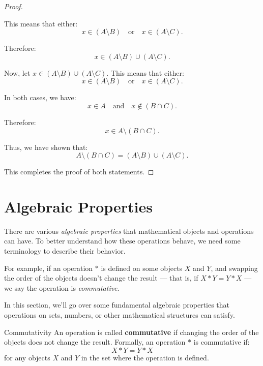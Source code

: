 \begin{proof}
\begin{enumerate}
        This means that either:
        \[
        x \in (A \setminus B) \quad \text{or} \quad x \in (A \setminus C).
        \]
        
        Therefore:
        \[
        x \in (A \setminus B) \cup (A \setminus C).
        \]
        
        Now, let \( x \in (A \setminus B) \cup (A \setminus C) \). This means that either:
        \[
        x \in (A \setminus B) \quad \text{or} \quad x \in (A \setminus C).
        \]
        
        In both cases, we have:
        \[
        x \in A \quad \text{and} \quad x \notin (B \cap C).
        \]
        
        Therefore:
        \[
        x \in A \setminus (B \cap C).
        \]
        
        Thus, we have shown that:
        \[
        A \setminus (B \cap C) = (A \setminus B) \cup (A \setminus C).
        \]
    \end{enumerate}
    
    This completes the proof of both statements.
\end{proof}    

\section{Algebraic Properties}

There are various \textit{algebraic properties} that mathematical objects and operations can have. To better understand how these operations behave, we need some terminology to describe their behavior. 

For example, if an operation \( * \) is defined on some objects \( X \) and \( Y \), and swapping the order of the objects doesn’t change the result — that is, if \( X * Y = Y * X \) — we say the operation is \textit{commutative}.

In this section, we’ll go over some fundamental algebraic properties that operations on sets, numbers, or other mathematical structures can satisfy.

\begin{definitionbox}{Commutativity}
    An operation is called \textbf{commutative} if changing the order of the objects does not change the result. Formally, an operation \( * \) is commutative if:  
    \[
    X * Y = Y * X
    \]
    for any objects \( X \) and \( Y \) in the set where the operation is defined.
\end{definitionbox}

